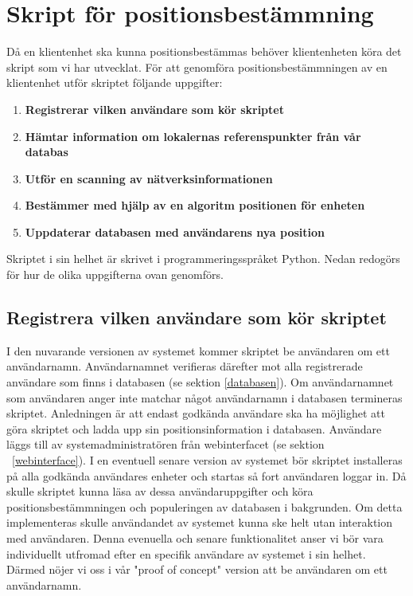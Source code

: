 \documentclass[swedish, a4paper,12pt]{article}
\begin{document}
\section{Skript för positionsbestämmning}


Då en klientenhet ska kunna positionsbestämmas behöver klientenheten köra det skript som vi har utvecklat. För att genomföra positionsbestämmningen av en klientenhet utför skriptet följande uppgifter:
\begin{enumerate}
  \item \textbf{Registrerar vilken användare som kör skriptet}
  \item \textbf{Hämtar information om lokalernas referenspunkter från vår databas}
  \item \textbf{Utför en scanning av nätverksinformationen}
  \item \textbf{Bestämmer med hjälp av en algoritm positionen för enheten}
  \item \textbf{Uppdaterar databasen med användarens nya position}
\end{enumerate}

Skriptet i sin helhet är skrivet i programmeringsspråket Python.
Nedan redogörs för hur de olika uppgifterna ovan genomförs.

\subsection{Registrera vilken användare som kör skriptet}
I den nuvarande versionen av systemet kommer skriptet be användaren om ett användarnamn.
Användarnamnet verifieras därefter mot alla registrerade användare som finns i databasen (se sektion \ref{databasen}). Om användarnamnet som användaren anger inte matchar något användarnamn i databasen termineras skriptet. Anledningen är att endast godkända användare ska ha möjlighet att göra skriptet och ladda upp sin positionsinformation i databasen. Användare läggs till av systemadministratören från webinterfacet (se sektion ~\ref{webinterface}). I en eventuell senare version av systemet bör skriptet installeras på alla godkända användares enheter och startas så fort användaren loggar in. Då skulle  skriptet kunna läsa av dessa användaruppgifter och köra positionsbestämmningen och populeringen av databasen i bakgrunden. Om detta implementeras skulle användandet av systemet kunna ske helt utan interaktion med användaren. Denna evenuella och senare funktionalitet anser vi bör vara individuellt utfromad efter en specifik användare av systemet i sin helhet. Därmed nöjer vi oss i vår "proof of concept" version att be användaren om ett användarnamn.
\end{document}

